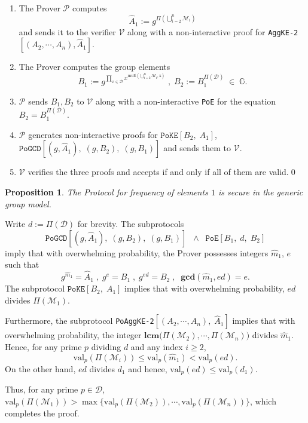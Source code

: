 \documentclass[11pt, lettersize, notitlepage, leqno, footskip=0.6cm]{article}
\newcommand{\pl}{\prod\limits}
\newcommand{\ttt}{\texttt}
\newcommand{\bG}{\mathbb{G}}
\newcommand{\mc}{\mathcal}
\newcommand{\mbf}{\mathbf}
\newcommand{\mr}{\mathrm}
\newcommand{\what}{\widehat}
\newcommand{\mP}{\mc{P}}
\newcommand{\V}{\mc{V}}
\newcommand{\mcM}{\mc{M}}
\newcommand{\vs}{\vspace{-0.15cm}}
\newcommand{\op}{overwhelming probability}
\newcommand{\LCM}{\mbf{lcm}}
\newcommand{\GCD}{\mbf{gcd}}
\newtheorem{Prop}[Thm]{Proposition}
\numberwithin{equation}{section}
\begin{document}
\begin{enumerate}[wide, labelwidth=!, labelindent=0pt] \vs

\item The Prover $\mP$ computes \vs $$\what{A}_1:= g^{\Pi\left(\bigcup\limits_{i=2}^n \mc{M}_i\right)} $$ and sends it to the verifier $\V$ along with a non-interactive proof for \verb|AggKE-2|$[(A_2,\cdots,A_n), \what{A}_1]$. \vs

\item The Prover computes the group elements \vs $$B_1:= g^{\pl_{x\in \mc{D}} x^{\mr{mult\left(\bigcup\limits_{i=2}^n \mc{M}_i, x\right)}}}\;,\;B_2:= B_1^{\Pi(\mc{D})} \;\in\; \bG.$$ \vspace{-0.8cm}

\item $\mP$ sends $B_1, B_2$ to $\V$ along with a non-interactive \verb|PoE| for the equation $B_2= B_1^{\Pi(\mc{D})}$. \vs

\item $\mP$ generates non-interactive proofs for $\ttt{PoKE}[B_2,\;A_1]$, $\ttt{PoGCD}[(g, \what{A}_1),\;(g, B_2),\;(g, B_1)]$ and sends them to $\V$.\vs

\item $\V$ verifies the three proofs and accepts if and only if all of them are valid.\qed\end{enumerate}

\begin{Prop} The Protocol for frequency of elements $1$ is secure in the generic group model. \end{Prop}

\begin{prf} Write $d:= \Pi(\mc{D})$ for brevity. The subprotocols \vs $$\ttt{PoGCD}[(g, \what{A}_1),\;(g, B_2),\;(g, B_1)]\;\;\wedge \;\;\ttt{PoE}[B_1,\; d,\; B_2]$$ imply that with \op, the Prover possesses integers $\what{m}_1$, $e$ such that \vs $$ g^{\what{m}_1} = \what{A}_1\;,\;g^{e} = B_1\;,\; g^{ed} = B_2\;,\;\;\GCD(\what{m}_1,ed) = e.$$ The subprotocol $\ttt{PoKE}[B_2,\;A_1]$ implies that with \op, $ed$ divides $\Pi(\mcM_1)$. 

Furthermore, the subprotocol \verb|PoAggKE-2|$[(A_2,\cdots,A_n),\; \what{A}_1]$ implies that with \op, the integer $\LCM\big(\Pi(\mcM_2),\cdots, \Pi(\mcM_n)\big)$ divides $\what{m}_1$. Hence, for any prime $p$ dividing $d$ and any index $i\geq 2$, \vs $$\mr{val}_p(\Pi(\mcM_i))\leq  \mr{val}_p(\what{m}_1) < \mr{val}_p(ed).$$ On the other hand, $ed$ divides $d_1$ and hence, $\mr{val}_p(ed)\leq \mr{val}_p(d_1)$. 

Thus, for any prime $p \in \mc{D}$, $\mr{val}_p(\Pi(\mcM_1))> \max\big\{\mr{val}_p(\Pi(\mcM_2)),\cdots, \mr{val}_p(\Pi(\mcM_n))\big\}$, which completes the proof.\end{prf}
\end{document}

